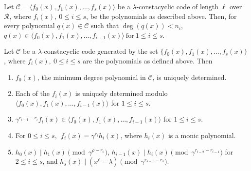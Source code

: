 \documentclass[10pt,a4paper]{amsart}
\begin{document}
\begin{lemma}\label{lem:first}
    Let $\mathcal{C}=\langle f_0(x),f_1(x),\dots, f_s(x)\rangle$ be a $\lambda$-constacyclic code of length $\ell$ over $\mathcal{R}$, where $f_i(x),~0 \le i \le s$, be the polynomials as described above. Then, for every polynomial $q(x) \in \mathcal{C}$ such that $\deg(q(x))<n_i$, $q(x) \in \langle f_0(x),f_1(x), \dots, f_{i-1}(x) \rangle ~\text{for}~ 1 \le i \le s$.
\end{lemma}

\begin{theorem}
    Let $\mathcal{C}$ be a $\lambda$-constacyclic code generated by the set $\{ f_0(x),f_1(x), \dots , f_s(x) \}$, where $f_i(x),~ 0 \le i \le s$ are the polynomials as defined above. Then
    \begin{enumerate}
        \item $f_0(x)$, the minimum degree polynomial in $\mathcal{C}$, is uniquely determined.
        \item Each of the $f_i(x)$ is uniquely determined modulo $\langle f_0(x),f_1(x), \dots , f_{i-1}(x) \rangle$ for $1 \le i \le s$.
        \item $\gamma^{r_{i-1}-r_i}f_i(x) \in \langle f_0(x), f_1(x), \dots, f_{i-1}(x) \rangle$ for $1 \le i \le s$. \label{thm:parttwo}
        \item For $0 \le i \le s,~~ f_i(x)=\gamma^{r_i}h_i(x)$, where $h_i(x)$ is a monic polynomial.\label{thm:partthree}
        \item $h_0(x) \mid h_1(x) \pmod{\gamma^{\rho-r_0}}$, $h_{i-1}(x) \mid h_i(x) \pmod{\gamma^{r_{i-2}-r_{i-1}}}$ for $2 \le i \le s$, and $h_s(x) \mid (x^{\ell}-\lambda) \pmod{\gamma^{r_{s-1}-r_s}}$.
    \end{enumerate}
\end{theorem}
\end{document}
